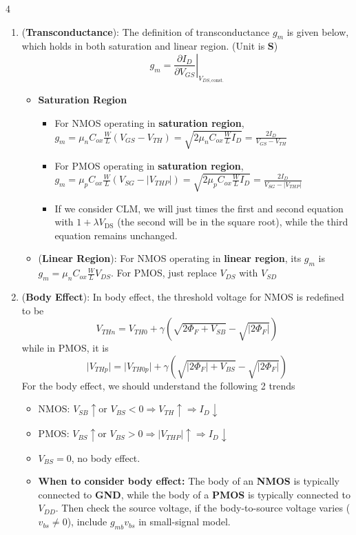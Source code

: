 \documentclass[10pt, landscape]{article}
\begin{document}
\begin{multicols}{4}
\begin{enumerate}
\begin{itemize}
    \end{itemize}
    \item (\textbf{Transconductance}): The definition of transconductance $g_m$ is given below, which holds in both saturation and linear region. (Unit is \textbf{S})
    $$g_m = \left. \frac{\partial I_D}{\partial V_{GS}} \right|_{V_{DS,\text{const.}}}$$
    \begin{itemize}
        \item \textbf{Saturation Region}
        \begin{itemize}
            \item For NMOS operating in \textbf{saturation region}, $g_m = \mu_n C_{ox} \frac{W}{L} (V_{GS} - V_{TH}) = \sqrt{2 \mu_n C_{ox} \frac{W}{L} I_D}= \frac{2 I_D}{V_{GS} - V_{TH}}$
            \item For PMOS operating in \textbf{saturation region}, $g_m = \mu_p C_{ox}\frac{W}{L}(V_{SG}-|V_{THP}|) = \sqrt{2\mu_p C_{ox}\frac{W}{L}I_D}=\frac{2I_D}{V_{SG}-|V_{THP}|}$
            \item If we consider CLM, we will just times the first and second equation with $1+\lambda V_{\text{DS}}$ (the second will be in the square root), while the third equation remains unchanged.
        \end{itemize}
        \item (\textbf{Linear Region}): For NMOS operating in \textbf{linear region}, its $g_m$ is $g_m=\mu_n C_{ox} \frac{W}{L} V_{DS}$. For PMOS, just replace $V_{DS}$ with $V_{SD}$
    \end{itemize}
    \item (\textbf{Body Effect}): In body effect, the threshold voltage for NMOS is redefined to be
    $$
    V_{THn} = V_{TH0} + \gamma \left( \sqrt{2\Phi_F + V_{SB}} - \sqrt{|2\Phi_F|} \right)
    $$
    while in PMOS, it is
    $$\vert{}V_{THp}\vert{} = \vert{}V_{TH0p}\vert{} + \gamma (\sqrt{\vert{}2\Phi_F\vert{} + V_{BS}} - \sqrt{\vert{}2\Phi_F\vert{}})$$
    For the body effect, we should understand the following 2 trends
    \begin{itemize}
        \item NMOS: $V_{SB}\uparrow \text{or } V_{BS}<0\Rightarrow V_{TH}\uparrow\Rightarrow I_D\downarrow$
        \item PMOS: $V_{BS}\uparrow \text{or } V_{BS}>0\Rightarrow |V_{THP}|\uparrow\Rightarrow I_D\downarrow$
        \item $V_{BS}=0$, no body effect.
        \item \textbf{When to consider body effect:} The body of an \textbf{NMOS} is typically connected to \textbf{GND}, while the body of a \textbf{PMOS} is typically connected to $V_{DD}$. Then check the source voltage, if the body-to-source voltage varies ($v_{bs}\neq 0$), include $g_{mb}v_{bs}$ in small-signal model.

\end{itemize}
\end{enumerate}
\end{multicols}
\end{document}
